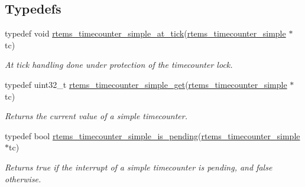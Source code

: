 \subsection*{Typedefs}
\begin{DoxyCompactItemize}
\item 
\mbox{\label{group__SAPITimecounter_ga7d6fb7805c66742ad1e13ca1c2b0ec57}} 
typedef void \mbox{\hyperlink{group__SAPITimecounter_ga7d6fb7805c66742ad1e13ca1c2b0ec57}{rtems\+\_\+timecounter\+\_\+simple\+\_\+at\+\_\+tick}}(\mbox{\hyperlink{structrtems__timecounter__simple}{rtems\+\_\+timecounter\+\_\+simple}} $\ast$tc)
\begin{DoxyCompactList}\small\item\em At tick handling done under protection of the timecounter lock. \end{DoxyCompactList}\item 
\mbox{\label{group__SAPITimecounter_gaf994ec0741af793766d17b42ee91a501}} 
typedef uint32\+\_\+t \mbox{\hyperlink{group__SAPITimecounter_gaf994ec0741af793766d17b42ee91a501}{rtems\+\_\+timecounter\+\_\+simple\+\_\+get}}(\mbox{\hyperlink{structrtems__timecounter__simple}{rtems\+\_\+timecounter\+\_\+simple}} $\ast$tc)
\begin{DoxyCompactList}\small\item\em Returns the current value of a simple timecounter. \end{DoxyCompactList}\item 
\mbox{\label{group__SAPITimecounter_gaaa16abdeb0f4bea8e2d535187ba33589}} 
typedef bool \mbox{\hyperlink{group__SAPITimecounter_gaaa16abdeb0f4bea8e2d535187ba33589}{rtems\+\_\+timecounter\+\_\+simple\+\_\+is\+\_\+pending}}(\mbox{\hyperlink{structrtems__timecounter__simple}{rtems\+\_\+timecounter\+\_\+simple}} $\ast$tc)
\begin{DoxyCompactList}\small\item\em Returns true if the interrupt of a simple timecounter is pending, and false otherwise. \end{DoxyCompactList}\end{DoxyCompactItemize}
